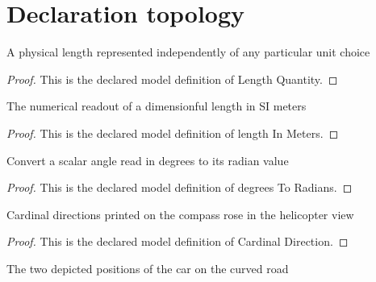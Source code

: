 \section{Declaration topology}
\begin{definition}
  \label{def:physics:phyx-mini-0667:phyxminiproblems-problemphyxmini0667-lengthquantity}
  A physical length represented independently of any particular unit choice
\end{definition}
\begin{proof}
  This is the declared model definition of Length Quantity.
\end{proof}
\begin{definition}
  \label{def:physics:phyx-mini-0667:phyxminiproblems-problemphyxmini0667-lengthinmeters}
  The numerical readout of a dimensionful length in SI meters
\end{definition}
\begin{proof}
  This is the declared model definition of length In Meters.
\end{proof}
\begin{definition}
  \label{def:physics:phyx-mini-0667:phyxminiproblems-problemphyxmini0667-degreestoradians}
  Convert a scalar angle read in degrees to its radian value
\end{definition}
\begin{proof}
  This is the declared model definition of degrees To Radians.
\end{proof}
\begin{definition}
  \label{def:physics:phyx-mini-0667:phyxminiproblems-problemphyxmini0667-cardinaldirection}
  Cardinal directions printed on the compass rose in the helicopter view
\end{definition}
\begin{proof}
  This is the declared model definition of Cardinal Direction.
\end{proof}
\begin{definition}
  \label{def:physics:phyx-mini-0667:phyxminiproblems-problemphyxmini0667-carposition}
  The two depicted positions of the car on the curved road
\end{definition}
